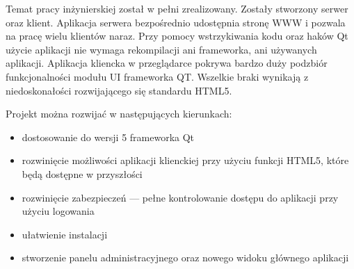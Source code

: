 Temat pracy inżynierskiej został w pełni zrealizowany. Zostały stworzony serwer oraz klient. Aplikacja serwera bezpośrednio udostępnia stronę WWW i pozwala na pracę wielu klientów naraz. Przy pomocy wstrzykiwania kodu oraz haków Qt użycie aplikacji nie wymaga rekompilacji ani frameworka, ani używanych aplikacji.
Aplikacja kliencka w przeglądarce pokrywa bardzo duży podzbiór funkcjonalności modułu UI frameworka QT. Wszelkie braki wynikają z niedoskonałości rozwijającego się standardu HTML5.

Projekt można rozwijać w następujących kierunkach:
\begin{itemize}
  \item dostosowanie do wersji 5 frameworka Qt
  \item rozwinięcie możliwości aplikacji klienckiej przy użyciu funkcji HTML5, które będą dostępne w przyszłości
  \item rozwinięcie zabezpieczeń --- pełne kontrolowanie dostępu do aplikacji przy użyciu logowania
  \item ułatwienie instalacji
  \item stworzenie panelu administracyjnego oraz nowego widoku głównego aplikacji
\end{itemize}
